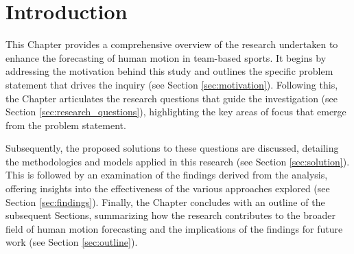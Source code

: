 \chapter{Introduction}
This Chapter provides a comprehensive overview of the research undertaken to enhance the forecasting of human motion in team-based sports. It begins by addressing the motivation behind this study and outlines the specific problem statement that drives the inquiry (see Section \ref{sec:motivation}). Following this, the Chapter articulates the research questions that guide the investigation (see Section \ref{sec:research_questions}), highlighting the key areas of focus that emerge from the problem statement.

Subsequently, the proposed solutions to these questions are discussed, detailing the methodologies and models applied in this research (see Section \ref{sec:solution}). This is followed by an examination of the findings derived from the analysis, offering insights into the effectiveness of the various approaches explored (see Section \ref{sec:findings}). Finally, the Chapter concludes with an outline of the subsequent Sections, summarizing how the research contributes to the broader field of human motion forecasting and the implications of the findings for future work (see Section \ref{sec:outline}).







